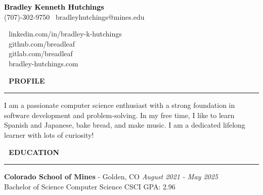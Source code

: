 \documentclass[10pt,letterpaper]{article}
\newcommand{\LinkedInIcon}{\,}
\newcommand{\GithubIcon}{\,}
\newcommand{\GitlabIcon}{\,}
\newcommand{\WebsiteIcon}{\,}
\newcommand{\ProfileIcon}{\,}
\newcommand{\EducationIcon}{\,}
\newcommand{\customtext}[2]{%
    {\fontsize{#1}{\dimexpr #1pt+2pt}\selectfont #2}%
}
\begin{document}
\mytextfont

\begin{flushleft}
    \begin{minipage}{0.48\textwidth}
        \textcolor{black}{\customtext{17}{\textbf{Bradley Kenneth Hutchings}}} \\
        \customtext{10}{(707)-302-9750 \textbullet \ bradleyhutchings@mines.edu}
    \end{minipage}
    \hfill
    \begin{minipage}{0.48\textwidth}
        \customtext{10}{\LinkedInIcon \ linkedin.com/in/bradley-k-hutchings} \\
        \customtext{10}{\GithubIcon \ github.com/breadleaf} \\
        \customtext{10}{\GitlabIcon \ gitlab.com/breadleaf} \\
        \customtext{10}{\WebsiteIcon \ bradley-hutchings.com}
    \end{minipage}

    \vspace{10pt}


    \textcolor{headercolor}{\customtext{14}{\ProfileIcon \ \textbf{PROFILE}}}
    \textcolor{gray}{\rule{\textwidth}{2pt}}

    \customtext{10}{I am a passionate computer science enthusiast with a strong foundation in software development and problem-solving. In my free time, I like to learn Spanish and Japanese, bake bread, and make music. I am a dedicated lifelong learner with lots of curiosity!}

    \vspace{10pt}


    \textcolor{headercolor}{\customtext{14}{\EducationIcon \ \textbf{EDUCATION}}}
    \textcolor{gray}{\rule{\textwidth}{2pt}}

    {\customtext{10}{\textbf{Colorado School of Mines} - Golden, CO} \hfill \customtext{10}{\textit{August 2021 - May 2025}}} \\
    \customtext{10}{Bachelor of Science Computer Science \hfill CSCI GPA: 2.96}

    \vspace{10pt}



\end{flushleft}
\end{document}
